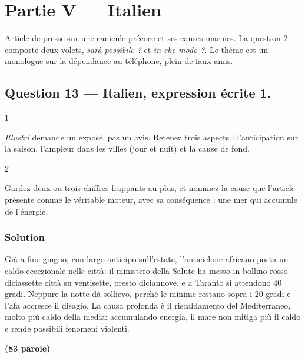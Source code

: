\documentclass[11pt,a4paper]{article}
\begin{document}
\hypertarget{partie-v-italien}{%
\section{Partie V --- Italien}\label{partie-v-italien}}

Article de presse sur une canicule précoce et ses causes marines. La question 2 comporte deux volets, \emph{sarà possibile ?} et \emph{in che modo ?}. Le thème est un monologue sur la dépendance au téléphone, plein de faux amis.

\hypertarget{question-13-italien-expression-uxe9crite-1.}{%
\subsection{Question 13 --- Italien, expression écrite 1.}\label{question-13-italien-expression-uxe9crite-1.}}

\begin{indication}{1}

\emph{Illustri} demande un exposé, pas un avis. Retenez trois aspects : l'anticipation sur la saison, l'ampleur dans les villes (jour et nuit) et la cause de fond.

\end{indication}

\begin{indication}{2}

Gardez deux ou trois chiffres frappants au plus, et nommez la cause que l'article présente comme le véritable moteur, avec sa conséquence : une mer qui accumule de l'énergie.

\end{indication}

\hypertarget{solution-12}{%
\subsubsection{Solution}\label{solution-12}}

Già a fine giugno, con largo anticipo sull'estate, l'anticiclone africano porta un caldo eccezionale nelle città: il ministero della Salute ha messo in bollino rosso diciassette città su ventisette, presto diciannove, e a Taranto si attendono 40 gradi. Neppure la notte dà sollievo, perché le minime restano sopra i 20 gradi e l'afa accresce il disagio. La causa profonda è il riscaldamento del Mediterraneo, molto più caldo della media: accumulando energia, il mare non mitiga più il caldo e rende possibili fenomeni violenti.

\textbf{(83 parole)}
\end{document}
